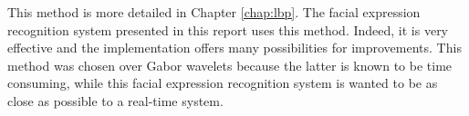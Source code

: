 \noindent This method is more detailed in Chapter \ref{chap:lbp}. The facial expression recognition system presented in this report uses this method. Indeed, it is very effective and the implementation offers many possibilities for improvements. This method was chosen over Gabor wavelets because the latter is known to be time consuming, while this facial expression recognition system is wanted to be as close as possible to a real-time system.

